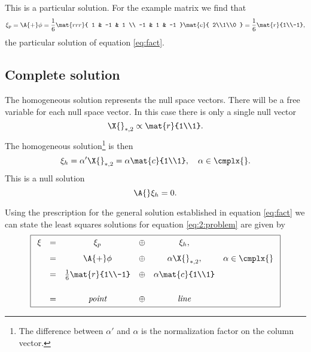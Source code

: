 This is a particular solution. For the example matrix  we find that
\begin{equation}
  \xi_{p} = \A{+}\phi = 
  \frac{1}{6}
  \mat{rrr}
  {
   1 & -1 &  1 \\
  -1 &  1 & -1
  } 
  \mat{c}
  {
  2\\1\\0
  }
  =
  \frac{1}{6}
  \mat{r}
  {1\\-1},
  \label{eq:soln:particular}
\end{equation}
the particular solution of equation \eqref{eq:fact}.

\subsection{Complete solution}
\label{sec:solution:complete}
The homogeneous solution represents the null space vectors. There will be a free variable for each null space vector. In this case there is only a single null vector
\begin{equation}
  \X{}_{*,2} \propto \mat{r}{1\\1}.
\end{equation}
The homogeneous solution\footnote{The difference between $\alpha'$ and $\alpha$ is the normalization factor on the column vector.} is then
\begin{equation}
  \xi_{h} = \alpha' \X{}_{*,2} = \alpha \mat{c}{1\\1},\quad \alpha \in \cmplx{}.
\end{equation}
This is a null solution
\begin{equation}
  \A{} \xi_{h} = 0.
\end{equation}

Using the prescription for the general solution established in equation \eqref{eq:fact} we can state the least squares solutions for equation \eqref{eq:2:problem} are given by
\begin{equation}
\boxed{
  \begin{array}{rccccc}
    \xi &=& \xi_{p} &\oplus& \xi_{h},\\[7pt]
      &=& \A{+}\phi &\oplus& \alpha \X{}_{*,2}, & \alpha\in\cmplx{}\\[7pt]
      &=& \frac{1}{6}\mat{r}{1\\-1} &\oplus& \alpha \mat{c}{1\\1}\\[17pt]
      &=& \textit{point} &\oplus& \textit{line}
  \end{array}
}
\label{eq:simple:fullsoln}
\end{equation}

